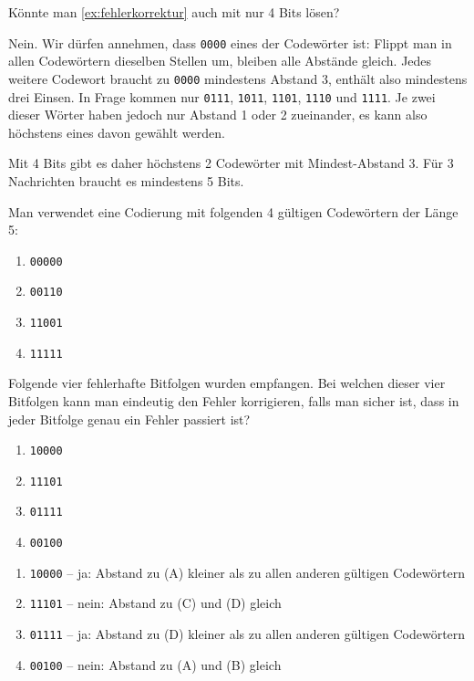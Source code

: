 \begin{mychallenge}\label{challenge:4bits}
    Könnte man \cref{ex:fehlerkorrektur} auch mit nur 4 Bits lösen?
    \begin{myanswer}
        Nein. Wir dürfen annehmen, dass \texttt{0000} eines der Codewörter ist: Flippt man in allen Codewörtern dieselben Stellen um, bleiben alle Abstände gleich. Jedes weitere Codewort braucht zu \texttt{0000} mindestens Abstand 3, enthält also mindestens drei Einsen. In Frage kommen nur \texttt{0111}, \texttt{1011}, \texttt{1101}, \texttt{1110} und \texttt{1111}. Je zwei dieser Wörter haben jedoch nur Abstand 1 oder 2 zueinander, es kann also höchstens eines davon gewählt werden.

        Mit 4 Bits gibt es daher höchstens 2 Codewörter mit Mindest-Abstand 3. Für 3 Nachrichten braucht es mindestens 5 Bits.
    \end{myanswer}
\end{mychallenge}

\begin{myexercise}
    Man verwendet eine Codierung mit folgenden 4 gültigen Codewörtern der Länge 5:
    \begin{enumerate}[label=(\Alph*)]
        \item \texttt{00000}
        \item \texttt{00110}
        \item \texttt{11001}
        \item \texttt{11111}
    \end{enumerate}
    Folgende vier fehlerhafte Bitfolgen wurden empfangen. Bei welchen dieser vier Bitfolgen kann man eindeutig den Fehler korrigieren, falls man sicher ist, dass in jeder Bitfolge genau ein Fehler passiert ist?
    \begin{enumerate}
        \item \texttt{10000}
        \item \texttt{11101}
        \item \texttt{01111}
        \item \texttt{00100}
    \end{enumerate}

    \begin{myanswer}
        \begin{enumerate}
            \item \texttt{10000} -- ja: Abstand zu (A) kleiner als zu allen anderen gültigen Codewörtern
            \item \texttt{11101} -- nein: Abstand zu (C) und (D) gleich
            \item \texttt{01111} -- ja: Abstand zu (D) kleiner als zu allen anderen gültigen Codewörtern
            \item \texttt{00100} -- nein: Abstand zu (A) und (B) gleich
        \end{enumerate}
    \end{myanswer}
\end{myexercise}


